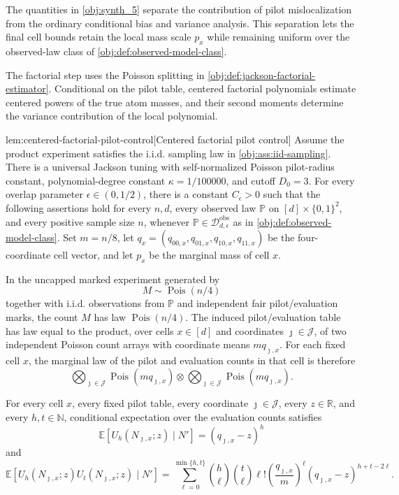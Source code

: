 The quantities in \cref{obj:synth_5} separate the contribution of pilot mislocalization from the ordinary conditional bias and variance analysis. This separation lets the final cell bounds retain the local mass scale \(p_x\) while remaining uniform over the observed-law class of \cref{obj:def:observed-model-class}.

The factorial step uses the Poisson splitting in \cref{obj:def:jackson-factorial-estimator}. Conditional on the pilot table, centered factorial polynomials estimate centered powers of the true atom masses, and their second moments determine the variance contribution of the local polynomial.

\begin{lemmav}{lem:centered-factorial-pilot-control}[Centered factorial pilot control]
Assume the product experiment satisfies the i.i.d. sampling law in \cref{obj:ass:iid-sampling}.  There is a universal Jackson tuning with self-normalized Poisson pilot-radius constant, polynomial-degree constant \(\kappa=1/100000\), and cutoff \(D_0=3\).  For every overlap parameter \(\epsilon\in(0,1/2)\), there is a constant \(C_\epsilon>0\) such that the following assertions hold for every \(n,d\), every observed law \(\mathbb P\) on \([d]\times\{0,1\}^2\), and every positive sample size \(n\), whenever \(\mathbb P\in\mathcal D_{d,\epsilon}^{\mathrm{obs}}\) as in \cref{obj:def:observed-model-class}.  Set \(m=n/8\), let \(q_x=(q_{00,x},q_{01,x},q_{10,x},q_{11,x})\) be the four-coordinate cell vector, and let \(p_x\) be the marginal mass of cell \(x\).

In the uncapped marked experiment generated by
\[
M\sim \operatorname{Pois}(n/4)
\]
together with i.i.d. observations from \(\mathbb P\) and independent fair pilot/evaluation marks, the count \(M\) has law \(\operatorname{Pois}(n/4)\).  The induced pilot/evaluation table has law equal to the product, over cells \(x\in[d]\) and coordinates \(\jmath\in\mathcal J\), of two independent Poisson count arrays with coordinate means \(m q_{\jmath,x}\).  For each fixed cell \(x\), the marginal law of the pilot and evaluation counts in that cell is therefore
\[
\bigotimes_{\jmath\in\mathcal J}\operatorname{Pois}(m q_{\jmath,x})
\otimes
\bigotimes_{\jmath\in\mathcal J}\operatorname{Pois}(m q_{\jmath,x}).
\]

For every cell \(x\), every fixed pilot table, every coordinate \(\jmath\in\mathcal J\), every \(z\in\mathbb R\), and every \(h,t\in\mathbb N\), conditional expectation over the evaluation counts satisfies
\[
\mathbb E\!\left[U_h(N_{\jmath,x};z)\mid N'\right]
=
(q_{\jmath,x}-z)^h
\]
and
\[
\mathbb E\!\left[U_h(N_{\jmath,x};z)U_t(N_{\jmath,x};z)\mid N'\right]
=
\sum_{\ell=0}^{\min\{h,t\}}
\binom{h}{\ell}\binom{t}{\ell}\ell!
\left(\frac{q_{\jmath,x}}{m}\right)^\ell
(q_{\jmath,x}-z)^{h+t-2\ell}.
\]


\end{lemmav}
